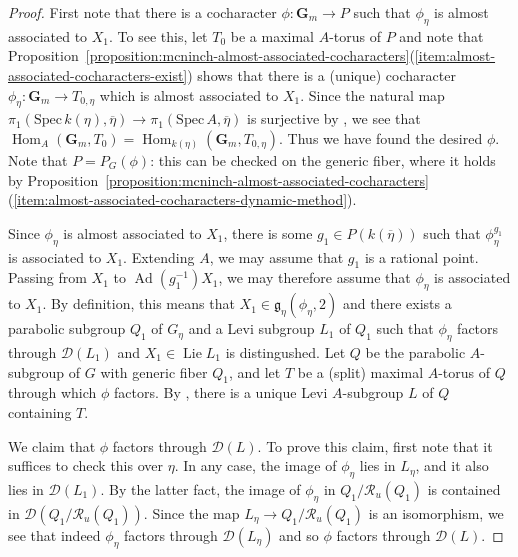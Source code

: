 \documentclass[11pt,reqno]{amsart}
\theoremstyle{definition}
\newcommand{\Spec}{\mathrm{Spec} \,}
\newcommand{\bG}{{\mathbf G}}
\newcommand{\sD}{{\mathscr D}}
\newcommand{\sR}{{\mathscr R}}
\newcommand{\fg}{\mathfrak{g}}
\DeclareMathOperator{\Ad}{Ad}
\DeclareMathOperator{\Hom}{Hom}
\DeclareMathOperator{\Lie}{Lie}
\begin{document}
\begin{proof}
First note that there is a cocharacter $\phi: \bG_m \to P$ such that $\phi_\eta$ is almost associated to $X_1$. To see this, let $T_0$ be a maximal $A$-torus of $P$ and note that Proposition~\ref{proposition:mcninch-almost-associated-cocharacters}(\ref{item:almost-associated-cocharacters-exist}) shows that there is a (unique) cocharacter $\phi_\eta: \bG_m \to T_{0,\eta}$ which is almost associated to $X_1$. Since the natural map $\pi_1(\Spec k(\eta), \overline{\eta}) \to \pi_1(\Spec A, \overline{\eta})$ is surjective by \cite[Exp.\ V, Prop.\ 8.2]{SGA1}, we see that $\Hom_A(\bG_m, T_0) = \Hom_{k(\eta)}(\bG_m, T_{0, \eta})$. Thus we have found the desired $\phi$. Note that $P = P_G(\phi)$: this can be checked on the generic fiber, where it holds by Proposition~\ref{proposition:mcninch-almost-associated-cocharacters}(\ref{item:almost-associated-cocharacters-dynamic-method}). \smallskip

Since $\phi_\eta$ is almost associated to $X_1$, there is some $g_1 \in P(k(\overline{\eta}))$ such that $\phi_\eta^{g_1}$ is associated to $X_1$. Extending $A$, we may assume that $g_1$ is a rational point. Passing from $X_1$ to $\Ad(g_1^{-1})X_1$, we may therefore assume that $\phi_\eta$ is associated to $X_1$. By definition, this means that $X_1 \in \fg_\eta(\phi_\eta, 2)$ and there exists a parabolic subgroup $Q_1$ of $G_\eta$ and a Levi subgroup $L_1$ of $Q_1$ such that $\phi_\eta$ factors through $\sD(L_1)$ and $X_1 \in \Lie L_1$ is distingushed. Let $Q$ be the parabolic $A$-subgroup of $G$ with generic fiber $Q_1$, and let $T$ be a (split) maximal $A$-torus of $Q$ through which $\phi$ factors. By \cite[Prop.\ 5.4.5]{Conrad}, there is a unique Levi $A$-subgroup $L$ of $Q$ containing $T$. \smallskip

We claim that $\phi$ factors through $\sD(L)$. To prove this claim, first note that it suffices to check this over $\eta$. In any case, the image of $\phi_\eta$ lies in $L_\eta$, and it also lies in $\sD(L_1)$. By the latter fact, the image of $\phi_\eta$ in $Q_1/\sR_u(Q_1)$ is contained in $\sD(Q_1/\sR_u(Q_1))$. Since the map $L_\eta \to Q_1/\sR_u(Q_1)$ is an isomorphism, we see that indeed $\phi_\eta$ factors through $\sD(L_\eta)$ and so $\phi$ factors through $\sD(L)$. \smallskip


\end{proof}
\end{document}
